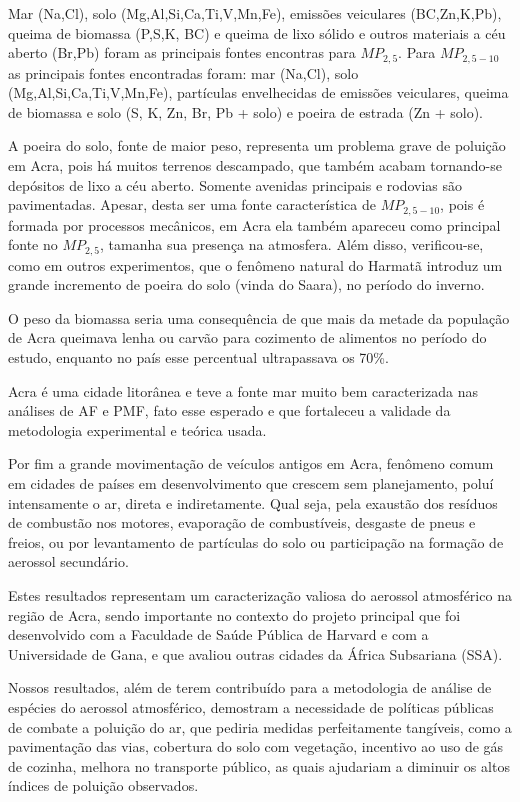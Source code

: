 Mar (Na,Cl), solo (Mg,Al,Si,Ca,Ti,V,Mn,Fe), emissões veiculares (BC,Zn,K,Pb), queima de biomassa (P,S,K, BC) e queima de lixo sólido e outros materiais a céu aberto (Br,Pb) foram as principais fontes encontras para $MP_{2,5}$. Para $MP_{2,5-10}$ as principais fontes encontradas foram: mar (Na,Cl), solo (Mg,Al,Si,Ca,Ti,V,Mn,Fe), partículas envelhecidas de emissões veiculares, queima de biomassa e solo (S, K, Zn, Br, Pb + solo) e poeira de estrada (Zn + solo).

A poeira do solo, fonte de maior peso, representa um problema grave de poluição em Acra, pois há muitos terrenos descampado, que também acabam tornando-se depósitos de lixo a céu aberto. Somente avenidas principais e rodovias são pavimentadas. Apesar, desta ser uma fonte característica de $MP_{2,5-10}$, pois é formada por processos mecânicos, em Acra ela também apareceu como principal fonte no $MP_{2,5}$, tamanha sua presença na atmosfera. Além disso, verificou-se, como em outros experimentos, que o fenômeno natural do Harmatã introduz um grande incremento de poeira do solo (vinda do Saara), no período do inverno.

O peso da biomassa seria uma consequência de que mais da metade da população de Acra queimava lenha ou carvão para cozimento de alimentos no período do estudo, enquanto no país esse percentual ultrapassava os 70\%.

Acra é uma cidade litorânea e teve a fonte mar muito bem caracterizada nas análises de AF e PMF, fato esse esperado e que fortaleceu a validade da metodologia experimental e teórica usada.

Por fim a grande movimentação de veículos antigos em Acra, fenômeno comum em cidades de países em desenvolvimento que crescem sem planejamento, poluí intensamente o ar, direta e indiretamente. Qual seja, pela exaustão dos resíduos de combustão nos motores, evaporação de combustíveis, desgaste de pneus e freios, ou por levantamento de partículas do solo ou participação na formação de aerossol secundário. 

Estes resultados representam um caracterização valiosa do aerossol atmosférico na região de Acra, sendo importante no contexto do projeto principal que foi desenvolvido com a Faculdade de Saúde Pública de Harvard e com a Universidade de Gana, e que avaliou outras cidades da África Subsariana (SSA). 

Nossos resultados, além de terem contribuído para a metodologia de análise de espécies do aerossol atmosférico, demostram a necessidade de políticas públicas de combate a poluição do ar, que pediria medidas perfeitamente tangíveis, como a pavimentação das vias, cobertura do solo com vegetação, incentivo ao uso de gás de cozinha, melhora no transporte público, as quais ajudariam a diminuir os altos índices de poluição observados.
